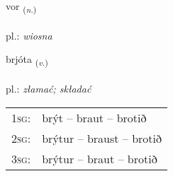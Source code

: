 \documentclass[frontgrid, backgrid]{flacards}\usepackage[]{graphicx}\usepackage[]{xcolor}
\begin{document}
\renewcommand{\blhead}{\vskip5pt {\small\bfseries\footnotesize Nafnorð | rzeczownik }}
\renewcommand{\bcfoot}{\vskip5pt \hspace{2pt}{\small\bfseries\footnotesize 1K}}


{vor \small{\textsubscript{(\textit{n.})}} \\[1ex] %
\textphonetic{[vɔːr]} \\
pl.: \emph{wiosna} \\  [2ex]
\renewcommand*{\arraystretch}{0.8}
}

\renewcommand{\flhead}{\vskip5pt \fboxsep=0pt {\small\bfseries\footnotesize Sagnorð | czasownik}}
\renewcommand{\fcfoot}{\vskip5pt \fboxsep=0pt \hspace{2pt}{\small\bfseries\footnotesize 1K}}

\renewcommand{\blhead}{\vskip5pt {\small\bfseries\footnotesize Sagnorð | czasownik }}
\renewcommand{\bcfoot}{\vskip5pt \hspace{2pt}{\small\bfseries\footnotesize 1K}}


{brjóta \small{\textsubscript{(\textit{v.})}} \\[1ex] %
\textphonetic{[prjouːta]} \\
pl.: \emph{złamać; składać} \\  [2ex]
\renewcommand*{\arraystretch}{0.8}
\begin{tabular}{p{1cm}l}
\textsc{1sg}: & brýt -- braut -- brotið \\ 
\textsc{2sg}: & brýtur -- braust -- brotið \\ 
\textsc{3sg}: & brýtur -- braut -- brotið \\ 
\end{tabular}
}
\end{document}
